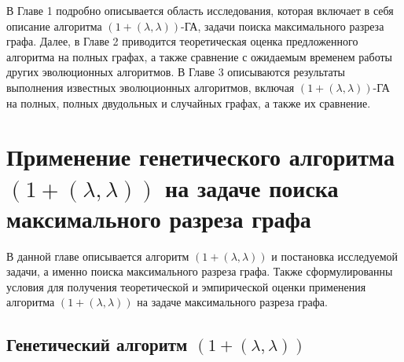 \documentclass[times]{itmo-student-thesis}
\newcommand{\alglambda}{${(1 + (\lambda , \lambda))}$\xspace}
\newcommand{\alglambdaf}{${(1 + (\lambda , \lambda))}$-ГА\xspace}
\begin{document}
В Главе 1 подробно описывается область исследования, которая включает в себя описание алгоритма \alglambdaf, задачи поиска максимального разреза графа.
Далее, в Главе 2 приводится теоретическая оценка предложенного алгоритма на полных графах, а также сравнение с ожидаемым временем работы других эволюционных алгоритмов.
В Главе 3 описываются результаты выполнения известных эволюционных алгоритмов, включая \alglambdaf на полных, полных двудольных и случайных графах, а также их сравнение.

\chapter{Применение генетического алгоритма \alglambda на задаче поиска максимального разреза графа}

\startrelatedwork
В данной главе описывается алгоритм \alglambda и постановка исследуемой задачи, а именно поиска максимального разреза графа.
Также сформулированны условия для получения теоретической и эмпирической оценки применения алгоритма \alglambda на задаче максимального разреза графа.
\finishrelatedwork

\section{Генетический алгоритм \alglambda}
\end{document}
